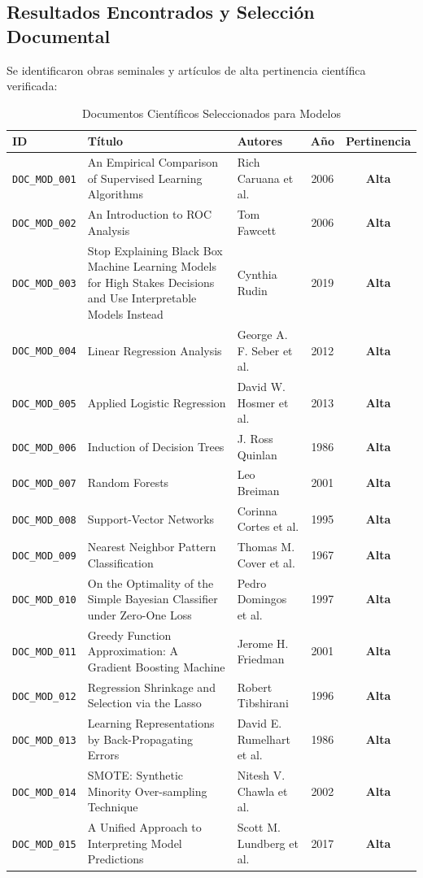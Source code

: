 \subsection{Resultados Encontrados y Selección Documental}
Se identificaron obras seminales y artículos de alta pertinencia científica verificada:
\begin{table}[H]
\centering
\scriptsize
\caption{Documentos Científicos Seleccionados para Modelos}
\begin{tabular}{p{1.8cm}p{4.5cm}p{3.2cm}cc}
\toprule
\textbf{ID} & \textbf{Título} & \textbf{Autores} & \textbf{Año} & \textbf{Pertinencia} \\
\midrule
\texttt{DOC_MOD_001} & An Empirical Comparison of Supervised Learning Algorithms & Rich Caruana et al. & 2006 & \textbf{Alta} \\
\texttt{DOC_MOD_002} & An Introduction to ROC Analysis & Tom Fawcett & 2006 & \textbf{Alta} \\
\texttt{DOC_MOD_003} & Stop Explaining Black Box Machine Learning Models for High Stakes Decisions and Use Interpretable Models Instead & Cynthia Rudin & 2019 & \textbf{Alta} \\
\texttt{DOC_MOD_004} & Linear Regression Analysis & George A. F. Seber et al. & 2012 & \textbf{Alta} \\
\texttt{DOC_MOD_005} & Applied Logistic Regression & David W. Hosmer et al. & 2013 & \textbf{Alta} \\
\texttt{DOC_MOD_006} & Induction of Decision Trees & J. Ross Quinlan & 1986 & \textbf{Alta} \\
\texttt{DOC_MOD_007} & Random Forests & Leo Breiman & 2001 & \textbf{Alta} \\
\texttt{DOC_MOD_008} & Support-Vector Networks & Corinna Cortes et al. & 1995 & \textbf{Alta} \\
\texttt{DOC_MOD_009} & Nearest Neighbor Pattern Classification & Thomas M. Cover et al. & 1967 & \textbf{Alta} \\
\texttt{DOC_MOD_010} & On the Optimality of the Simple Bayesian Classifier under Zero-One Loss & Pedro Domingos et al. & 1997 & \textbf{Alta} \\
\texttt{DOC_MOD_011} & Greedy Function Approximation: A Gradient Boosting Machine & Jerome H. Friedman & 2001 & \textbf{Alta} \\
\texttt{DOC_MOD_012} & Regression Shrinkage and Selection via the Lasso & Robert Tibshirani & 1996 & \textbf{Alta} \\
\texttt{DOC_MOD_013} & Learning Representations by Back-Propagating Errors & David E. Rumelhart et al. & 1986 & \textbf{Alta} \\
\texttt{DOC_MOD_014} & SMOTE: Synthetic Minority Over-sampling Technique & Nitesh V. Chawla et al. & 2002 & \textbf{Alta} \\
\texttt{DOC_MOD_015} & A Unified Approach to Interpreting Model Predictions & Scott M. Lundberg et al. & 2017 & \textbf{Alta} \\
\bottomrule
\end{tabular}
\end{table}


